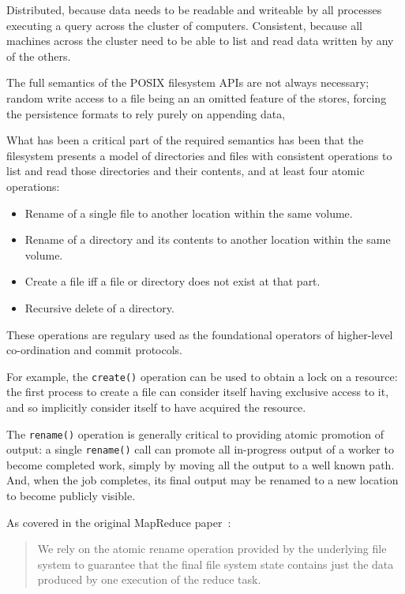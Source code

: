 \documentclass[conference]{IEEEtran}
\begin{document}
Distributed, because data needs to be readable and writeable by all processes
executing a query across the cluster of computers.
Consistent, because all machines across the cluster need to be able to
list and read data written by any of the others.

The full semantics of the POSIX filesystem APIs are not always necessary;
random write access to a file being an an omitted feature of the stores,
forcing the persistence formats to rely purely on appending data,

What has been a critical part of the required semantics has been that the filesystem
presents a model of directories and files with consistent operations to list and
read those directories and their contents, and at least four atomic operations:

\begin{itemize}
  \item Rename of a single file to another location within the same volume.
  \item Rename of a directory and its contents to another location within the same volume.
  \item Create a file iff a file or directory does not exist at that part.
  \item Recursive delete of a directory.
\end{itemize}

These operations are regulary used as the foundational operators of higher-level
co-ordination and commit protocols.

For example, the \texttt{create()} operation can be used to obtain a lock on a resource:
the first process to create a file can consider itself having exclusive access to it,
and so implicitly consider itself to have acquired the resource.

The \texttt{rename()} operation is generally critical to providing atomic promotion
of output: a single \texttt{rename()} call can promote all in-progress output
of a worker to become completed work, simply by moving all the output to a well known path.
And, when the job completes, its final output may be renamed to a new location to become
publicly visible.

As covered in the original MapReduce paper\ \cite{MapReduce}:

\begin{quote}
We rely on the atomic rename operation provided by the underlying file system
to guarantee that the final file system state contains just the data produced
by one execution of the reduce task.
\end{quote}
\end{document}
